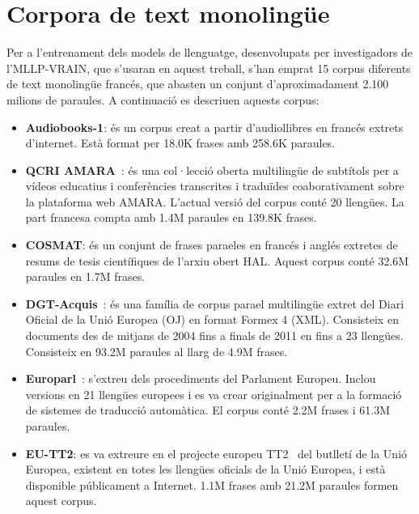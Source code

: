 \section{Corpora de text monolingüe}
\label{cap04_corpus_audio}

Per a l'entrenament dels models de llenguatge, desenvolupats per investigadors de l'MLLP-VRAIN, que s'usaran en aquest treball, s'han emprat 15 corpus diferents de text monolingüe francés, que abasten un conjunt d'aproximadament 2.100 milions de paraules. A continuació es descriuen aquests corpus:

\begin{itemize}
\item \textbf{Audiobooks-1}: és un corpus creat a partir d'audiollibres en francés extrets d'internet. Està format per 18.0K frases amb 258.6K paraules.

\item \textbf{QCRI AMARA}~\cite{amara}: és una col·lecció oberta multilingüe de subtítols per a vídeos educatius i conferències transcrites i traduïdes co\lgem aborativament sobre la plataforma web AMARA. L'actual versió del corpus conté 20 llengües. La part francesa compta amb 1.4M paraules en 139.8K frases.

\item \textbf{COSMAT}: és un conjunt de frases para\lgem eles en francés i anglés extretes de resums de tesis científiques de l'arxiu obert HAL. Aquest corpus conté 32.6M paraules en 1.7M frases.

\item \textbf{DGT-Acquis}~\cite{dgt}: és una família de corpus para\lgem el multilingüe extret del Diari Oficial de la Unió Europea (OJ) en format Formex 4 (XML). Consisteix en documents des de mitjans de 2004 fins a finals de 2011 en fins a 23 llengües. Consisteix en 93.2M paraules al llarg de 4.9M frases.

\item \textbf{Europarl}~\cite{europarl}: s'extreu dels procediments del Parlament Europeu. Inclou versions en 21 llengües europees i es va crear originalment per a la formació de sistemes de traducció automàtica. El corpus conté 2.2M frases i 61.3M paraules.

\item \textbf{EU-TT2}: es va extreure en el projecte europeu TT2~\cite{eu-tt2} del butlletí de la Unió Europea, existent en totes les llengües oficials de la Unió Europea, i està disponible públicament a Internet. 1.1M frases amb 21.2M paraules formen aquest corpus.


\end{itemize}
